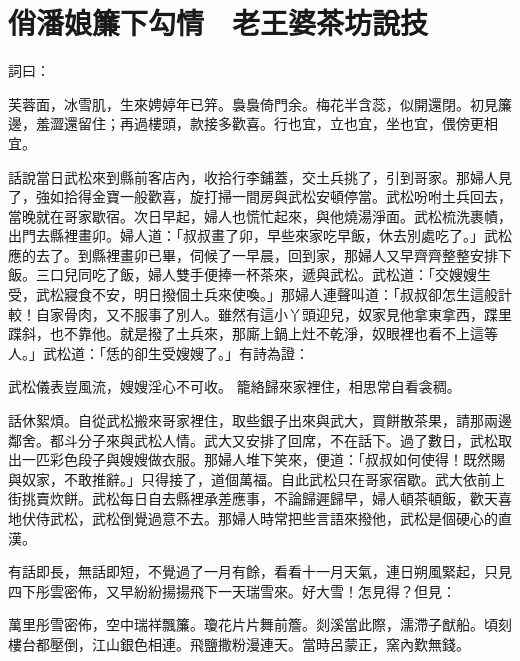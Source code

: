 %

\chapter{俏潘娘簾下勾情　老王婆茶坊說技}

詞曰：

芙蓉面，冰雪肌，生來娉婷年已笄。裊裊倚門余。梅花半含蕊，似開還閉。初見簾邊，羞澀還留住；再過樓頭，款接多歡喜。行也宜，立也宜，坐也宜，偎傍更相宜。

話說當日武松來到縣前客店內，收拾行李鋪蓋，交土兵挑了，引到哥家。那婦人見了，強如拾得金寶一般歡喜，旋打掃一間房與武松安頓停當。武松吩咐土兵回去，當晚就在哥家歇宿。次日早起，婦人也慌忙起來，與他燒湯淨面。武松梳洗裹幘，出門去縣裡畫卯。婦人道：「叔叔畫了卯，早些來家吃早飯，休去別處吃了。」武松應的去了。到縣裡畫卯已畢，伺候了一早晨，回到家，那婦人又早齊齊整整安排下飯。三口兒同吃了飯，婦人雙手便捧一杯茶來，遞與武松。武松道：「交嫂嫂生受，武松寢食不安，明日撥個土兵來使喚。」那婦人連聲叫道：「叔叔卻怎生這般計較！自家骨肉，又不服事了別人。雖然有這小丫頭迎兒，奴家見他拿東拿西，蹀里蹀斜，也不靠他。就是撥了土兵來，那廝上鍋上灶不乾淨，奴眼裡也看不上這等人。」武松道：「恁的卻生受嫂嫂了。」有詩為證：

武松儀表豈風流，嫂嫂淫心不可收。
籠絡歸來家裡住，相思常自看衾稠。

話休絮煩。自從武松搬來哥家裡住，取些銀子出來與武大，買餅散茶果，請那兩邊鄰舍。都斗分子來與武松人情。武大又安排了回席，不在話下。過了數日，武松取出一匹彩色段子與嫂嫂做衣服。那婦人堆下笑來，便道：「叔叔如何使得！既然賜與奴家，不敢推辭。」只得接了，道個萬福。自此武松只在哥家宿歇。武大依前上街挑賣炊餅。武松每日自去縣裡承差應事，不論歸遲歸早，婦人頓茶頓飯，歡天喜地伏侍武松，武松倒覺過意不去。那婦人時常把些言語來撥他，武松是個硬心的直漢。

有話即長，無話即短，不覺過了一月有餘，看看十一月天氣，連日朔風緊起，只見四下彤雲密佈，又早紛紛揚揚飛下一天瑞雪來。好大雪！怎見得？但見：

萬里彤雪密佈，空中瑞祥飄簾。瓊花片片舞前簷。剡溪當此際，濡滯子猷船。頃刻樓台都壓倒，江山銀色相連。飛鹽撒粉漫連天。當時呂蒙正，窯內歎無錢。

